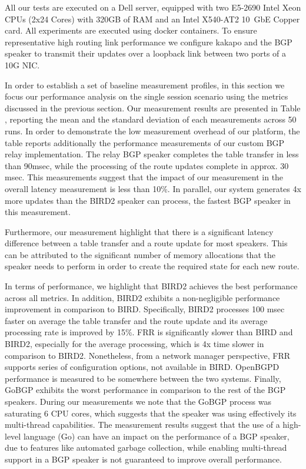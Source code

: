All our tests are executed on a Dell server, equipped with two E5-2690 Intel Xeon
CPUs (2x24 Cores) with 320GB of RAM and an Intel X540-AT2 10~GbE Copper
card. All experiments are executed using docker containers. To ensure
representative high routing link performance we configure kakapo and the BGP speaker to transmit their
updates over a loopback link between two ports of a 10G NIC.


% 

In order to establish a set of baseline measurement profiles, in this section
we focus our performance analysis on the single session scenario using the
metrics discussed in the previous section.  Our measurement results are
presented in Table , reporting the mean and the standard
deviation of each measurements across 50 runs. In order to demonstrate the low
measurement overhead of our platform, the table reports additionally the
performance measurements of our custom BGP relay implementation. The relay BGP
speaker completes the table transfer in less than 90msec, while the processing
of the route updates complete in approx. 30 msec. This measurements suggest
that the impact of our measurement in the overall latency measurement is less
than 10\%. In parallel, our system generates 4x more updates than the BIRD2
speaker can process, the fastest BGP speaker in this measurement.

Furthermore, our measurement highlight that there is a significant latency
difference between a table transfer and a route update for most speakers. This
can be attributed to the significant number of memory allocations that the
speaker needs to perform in order to create the required state for each new route.

In terms of performance, we highlight that BIRD2 achieves the best performance
across all metrics. In addition, BIRD2 exhibits a non-negligible performance
improvement in comparison to BIRD. Specifically, BIRD2 processes 100 msec
faster on average the table transfer and the route update and its average
processing rate is improved by 15\%. FRR is significantly slower than BIRD and
BIRD2, especially for the average processing, which is 4x time slower in
comparison to BIRD2. Nonetheless, from a network manager perspective, FRR
supports series of configuration options, not available in BIRD. OpenBGPD
performance is measured to be somewhere between the two systems. Finally, GoBGP
exhibits the worst performance in comparison to the rest of the BGP speakers.
During our measurements we note that the GoBGP process was saturating 6 CPU
cores, which suggests that the speaker was using effectively its multi-thread
capabilities. The measurement results suggest that the use of a high-level
language (Go) can have an impact on the performance of a BGP speaker, due to
features like automated garbage collection,
while enabling multi-thread support in a BGP speaker is not guaranteed to
improve overall performance.


